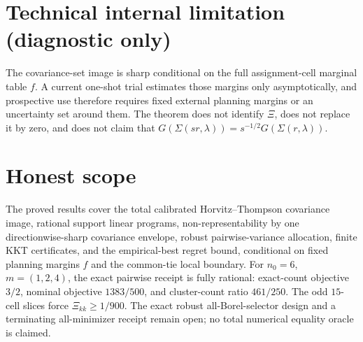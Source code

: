 \documentclass{article}
\begin{document}
\section*{Technical internal limitation (diagnostic only)}

The covariance-set image is sharp conditional on the full assignment-cell marginal table \(f\). A current one-shot trial estimates those margins only asymptotically, and prospective use therefore requires fixed external planning margins or an uncertainty set around them. The theorem does not identify \(\Xi\), does not replace it by zero, and does not claim that \(G(\Sigma(sr,\lambda))=s^{-1/2}G(\Sigma(r,\lambda))\).

\section{Honest scope}

The proved results cover the total calibrated Horvitz--Thompson covariance image, rational support linear programs, non-representability by one directionwise-sharp covariance envelope, robust pairwise-variance allocation, finite KKT certificates, and the empirical-best regret bound, conditional on fixed planning margins \(f\) and the common-tie local boundary. For \(n_0=6\), \(m=(1,2,4)\), the exact pairwise receipt is fully rational: exact-count objective \(3/2\), nominal objective \(1383/500\), and cluster-count ratio \(461/250\). The odd \(15\)-cell slices force \(\Xi_{kk}\ge1/900\). The exact robust all-Borel-selector design and a terminating all-minimizer receipt remain open; no total numerical equality oracle is claimed.
\end{document}
